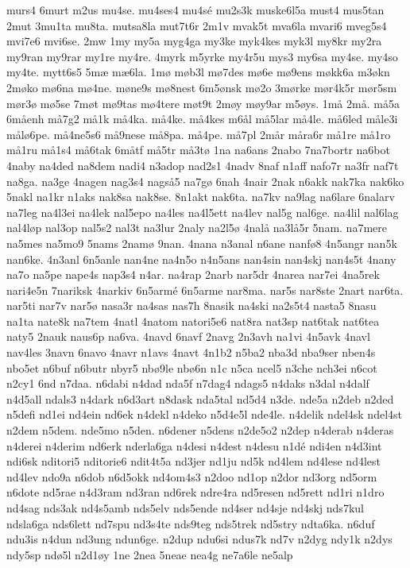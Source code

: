 {murs4
6murt
m2us
mu4se.
mu4ses4
mu4sé
mu2s3k
muske6l5a
must4
mus5tan
2mut
3mu1ta
mu8ta.
mutsa8la
mut7t6r
2m1v
mvak5t
mva6la
mvari6
mveg5s4
mvi7e6
mvi6se.
2mw
1my
my5a
myg4ga
my3ke
myk4kes
myk3l
my8kr
my2ra
my9ran
my9rar
my1re
my4re.
4myrk
m5yrke
my4r5u
mys3
my6sa
my4se.
my4so
my4te.
mytt6s5
5mæ
mæ6la.
1mø
møb3l
mø7des
mø6e
mø9ens
møkk6a
m3økn
2møko
mø6na
mø4ne.
møne9s
mø8nest
6m5ønsk
mø2o
3mørke
mør4k5r
mør5sm
mør3ø
mø5se
7møt
mø9tas
mø4tere
møt9t
2møy
møy9ar
m5øys.
1må
2må.
må5a
6måenh
må7g2
må1k
må4ka.
må4ke.
må4kes
m6ål
må5lar
må4le.
må6led
måle3i
målø6pe.
må4ne5s6
må9nese
må8pa.
må4pe.
må7pl
2mår
måra6r
må1re
må1ro
må1ru
må1s4
må6tak
6måtf
må5tr
må3tø
1na
na6ans
2nabo
7na7bortr
na6bot
4naby
na4ded
na8dem
nadi4
n3adop
nad2s1
4nadv
8naf
n1aff
nafo7r
na3fr
naf7t
na8ga.
na3ge
4nagen
nag3s4
nagså5
na7gø
6nah
4nair
2nak
n6akk
nak7ka
nak6ko
5nakl
na1kr
n1aks
nak8sa
nak8se.
8n1akt
nak6ta.
na7kv
na9lag
na6lare
6nalarv
na7leg
na4l3ei
na4lek
nal5epo
na4les
na4l5ett
na4lev
nal5g
nal6ge.
na4lil
nal6lag
nal4løp
nal3op
nal5s2
nal3t
na3lur
2naly
na2l5ø
4nalå
na3lå5r
5nam.
na7mere
na5mes
na5mo9
5nams
2namø
9nan.
4nana
n3anal
n6ane
nanfø8
4n5angr
nan5k
nan6ke.
4n3anl
6n5anle
nan4ne
na4n5o
n4n5ans
nan4sin
nan4skj
nan4s5t
4nany
na7o
na5pe
nape4s
nap3s4
n4ar.
na4rap
2narb
nar5dr
4narea
nar7ei
4na5rek
nari4e5n
7nariksk
4narkiv
6n5armé
6n5arme
nar8ma.
nar5s
nar8ste
2nart
nar6ta.
nar5ti
nar7v
nar5ø
nasa3r
na4sas
nas7h
8nasik
na4ski
na2s5t4
nasta5
8nasu
na1ta
nate8k
na7tem
4natl
4natom
natori5e6
nat8ra
nat3sp
nat6tak
nat6tea
naty5
2nauk
naus6p
na6va.
4navd
6navf
2navg
2n3avh
na1vi
4n5avk
4navl
nav4les
3navn
6navo
4navr
n1avs
4navt
4n1b2
n5ba2
nba3d
nba9ser
nben4s
nbo5et
n6buf
n6butr
nbyr5
nbø9le
nbø6n
n1c
n5ca
ncel5
n3che
nch3ei
n6cot
n2cy1
6nd
n7daa.
n6dabi
n4dad
nda5f
n7dag4
ndags5
n4daks
n3dal
n4dalf
n4d5all
ndals3
n4dark
n6d3art
n8dask
nda5tal
nd5d4
n3de.
nde5a
n2deb
n2ded
n5defi
nd1ei
nd4ein
nd6ek
n4dekl
n4deko
n5d4e5l
nde4le.
n4delik
ndel4sk
ndel4st
n2dem
n5dem.
nde5mo
n5den.
n6dener
n5dens
n2de5o2
n2dep
n4derab
n4deras
n4derei
n4derim
nd6erk
nderla6ga
n4desi
n4dest
n4desu
n1dé
ndi4en
n4d3int
ndi6sk
nditori5
nditorie6
ndit4t5a
nd3jer
nd1ju
nd5k
nd4lem
nd4lese
nd4lest
nd4lev
ndo9a
n6dob
n6d5okk
nd4om4s3
n2doo
nd1op
n2dor
nd3org
nd5orm
n6dote
nd5rae
n4d3ram
nd3ran
nd6rek
ndre4ra
nd5resen
nd5rett
nd1ri
n1dro
nd4sag
nds3ak
nd4s5amb
nds5elv
nds5ende
nd4ser
nd4sje
nd4skj
nds7kul
ndsla6ga
nds6lett
nd7spu
nd3s4te
nds9teg
nds5trek
nd5stry
ndta6ka.
n6duf
ndu3is
n4dun
nd3ung
ndun6ge.
n2dup
ndu6si
ndus7k
nd7v
n2dyg
ndy1k
n2dys
ndy5sp
ndø5l
n2d1øy
1ne
2nea
5neae
nea4g
ne7a6le
ne5alp
}
